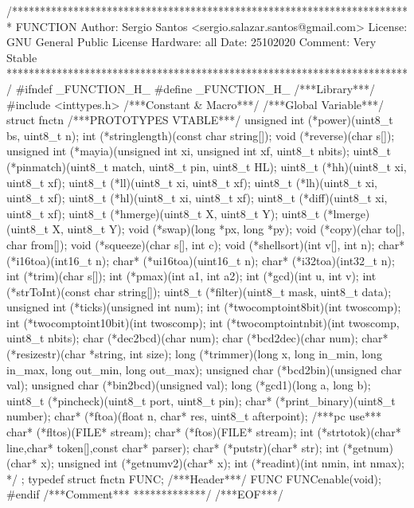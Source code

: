 \begin{verbatimtab}
/************************************************************************
FUNCTION
Author: Sergio Santos
<sergio.salazar.santos@gmail.com>
License: GNU General Public License
Hardware: all
Date: 25102020
Comment:
Very Stable
************************************************************************/
#ifndef _FUNCTION_H_
#define _FUNCTION_H_
/***Library***/
#include <inttypes.h>
/***Constant & Macro***/
/***Global Variable***/
struct fnctn{
	/***PROTOTYPES VTABLE***/
	unsigned int (*power)(uint8_t bs, uint8_t n);
	int (*stringlength)(const char string[]);
	void (*reverse)(char s[]);
	unsigned int (*mayia)(unsigned int xi, unsigned int xf, uint8_t nbits);
	uint8_t (*pinmatch)(uint8_t match, uint8_t pin, uint8_t HL);
	uint8_t (*hh)(uint8_t xi, uint8_t xf);
	uint8_t (*ll)(uint8_t xi, uint8_t xf);
	uint8_t (*lh)(uint8_t xi, uint8_t xf);
	uint8_t (*hl)(uint8_t xi, uint8_t xf);
	uint8_t (*diff)(uint8_t xi, uint8_t xf);
	uint8_t (*hmerge)(uint8_t X, uint8_t Y);
	uint8_t (*lmerge)(uint8_t X, uint8_t Y);
	void (*swap)(long *px, long *py);
	void (*copy)(char to[], char from[]);
	void (*squeeze)(char s[], int c);
	void (*shellsort)(int v[], int n);
	char* (*i16toa)(int16_t n);
	char* (*ui16toa)(uint16_t n);
	char* (*i32toa)(int32_t n);
	int (*trim)(char s[]);
	int (*pmax)(int a1, int a2);
	int (*gcd)(int u, int v);
	int (*strToInt)(const char string[]);
	uint8_t (*filter)(uint8_t mask, uint8_t data);
	unsigned int (*ticks)(unsigned int num);
	int (*twocomptoint8bit)(int twoscomp);
	int (*twocomptoint10bit)(int twoscomp);
	int (*twocomptointnbit)(int twoscomp, uint8_t nbits);
	char (*dec2bcd)(char num);
	char (*bcd2dec)(char num);
	char* (*resizestr)(char *string, int size);
	long (*trimmer)(long x, long in_min, long in_max, long out_min, long out_max);
	unsigned char (*bcd2bin)(unsigned char val);
	unsigned char (*bin2bcd)(unsigned val);
	long (*gcd1)(long a, long b);
	uint8_t (*pincheck)(uint8_t port, uint8_t pin);
	char* (*print_binary)(uint8_t number);
	char* (*ftoa)(float n, char* res, uint8_t afterpoint);
	/***pc use***
	char* (*fltos)(FILE* stream);
	char* (*ftos)(FILE* stream);
	int (*strtotok)(char* line,char* token[],const char* parser);
	char* (*putstr)(char* str);
	int (*getnum)(char* x);
	unsigned int (*getnumv2)(char* x);
	int (*readint)(int nmin, int nmax);
	*/
};
typedef struct fnctn FUNC;
/***Header***/
FUNC FUNCenable(void);
#endif
/***Comment***
*************/
/***EOF***/
\end{verbatimtab}